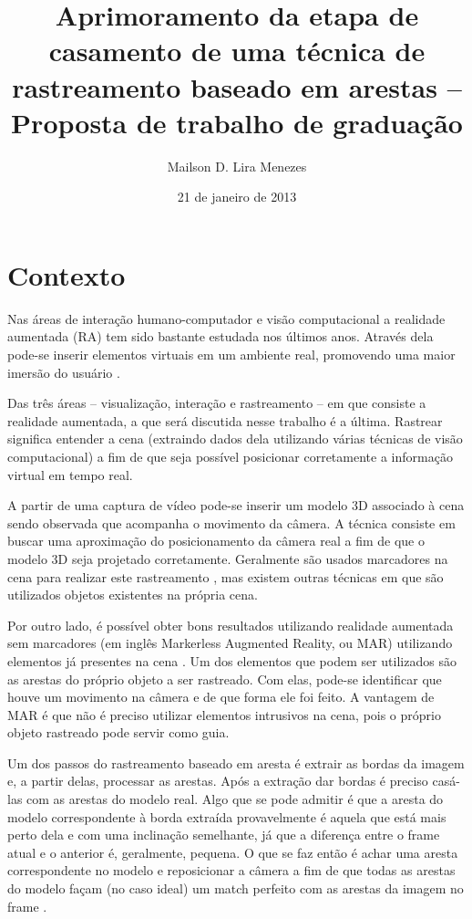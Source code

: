 \documentclass[a4paper, 12pt]{article}
\title{Aprimoramento da etapa de casamento de uma técnica de rastreamento baseado em arestas -- Proposta de trabalho de graduação}
\date{21 de janeiro de 2013}
\author{Mailson D. Lira Menezes}
\begin{document}
\maketitle

\section{Contexto}

Nas áreas de interação humano-computador e visão computacional a realidade aumentada (RA) tem sido bastante estudada nos últimos anos. Através dela pode-se inserir elementos virtuais em um ambiente real, promovendo uma maior imersão do usuário \cite{azuma1997survey}.

Das três áreas -- visualização, interação e rastreamento -- em que consiste a realidade aumentada, a que será discutida nesse trabalho é a última. Rastrear significa entender a cena (extraindo dados dela utilizando várias técnicas de visão computacional) a fim de que seja possível posicionar corretamente a informação virtual em tempo real.

A partir de uma captura de vídeo pode-se inserir um modelo 3D associado à cena sendo observada que acompanha o movimento da câmera. A técnica consiste em buscar uma aproximação do posicionamento da câmera real a fim de que o modelo 3D seja projetado corretamente. Geralmente são usados marcadores na cena para realizar este rastreamento \cite{roberto2012mestrado}, mas existem outras técnicas em que são utilizados objetos existentes na própria cena.

Por outro lado, é possível obter bons resultados utilizando realidade aumentada sem marcadores (em inglês Markerless Augmented Reality, ou MAR) utilizando elementos já presentes na cena \cite{teichrieb2007survey}. Um dos elementos que podem ser utilizados são as arestas do próprio objeto a ser rastreado. Com elas, pode-se identificar que houve um movimento na câmera e de que forma ele foi feito. A vantagem de MAR é que não é preciso utilizar elementos intrusivos na cena, pois o próprio objeto rastreado pode servir como guia.

Um dos passos do rastreamento baseado em aresta é extrair as bordas da imagem e, a partir delas, processar as arestas. Após a extração dar bordas é preciso casá-las com as arestas do modelo real. Algo que se pode admitir é que a aresta do modelo correspondente à borda extraída provavelmente é aquela que está mais perto dela e com uma inclinação semelhante, já que a diferença entre o frame atual e o anterior é, geralmente, pequena. O que se faz então é achar uma aresta correspondente no modelo e reposicionar a câmera a fim de que todas as arestas do modelo façam (no caso ideal) um match perfeito com as arestas da imagem no frame \cite{tgchico}.
\end{document}
